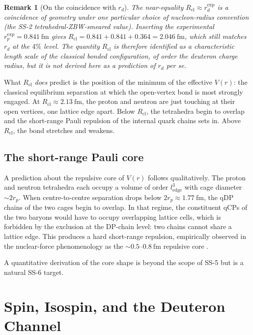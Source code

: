 \documentclass[11pt,letterpaper]{article}
\newtheorem{remark}[theorem]{Remark}
\newcommand{\ledge}{l_{\mathrm{edge}}}
\newcommand{\rp}{r_{p}}
\begin{document}
\begin{remark}[On the coincidence with $r_d$]
\label{rem:coincidence}
The near-equality $R_{\mathrm{cl}} \approx r_d^{\mathrm{exp}}$ is a coincidence of geometry under one particular choice of nucleon-radius convention (the SS-2 tetrahedral-ZBW-smeared value). Inserting the experimental $\rp^{\mathrm{exp}} = 0.841~\mathrm{fm}$ gives $R_{\mathrm{cl}} = 0.841 + 0.841 + 0.364 = 2.046~\mathrm{fm}$, which still matches $r_d$ at the $4\%$ level. The quantity $R_{\mathrm{cl}}$ is therefore identified as a characteristic length scale of the classical bonded configuration, of order the deuteron charge radius, but it is not derived here as a prediction of $r_d$ per se.
\end{remark}

What $R_{\mathrm{cl}}$ \emph{does} predict is the position of the minimum of the effective $V(r)$: the classical equilibrium separation at which the open-vertex bond is most strongly engaged. At $R_{\mathrm{cl}} \approx 2.13~\mathrm{fm}$, the proton and neutron are just touching at their open vertices, one lattice edge apart. Below $R_{\mathrm{cl}}$, the tetrahedra begin to overlap and the short-range Pauli repulsion of the internal quark chains sets in. Above $R_{\mathrm{cl}}$, the bond stretches and weakens.

\subsection{The short-range Pauli core}
\label{sec:pauli_core}

A prediction about the repulsive core of $V(r)$ follows qualitatively. The proton and neutron tetrahedra each occupy a volume of order $\ledge^3$ with cage diameter $\sim 2\rp$. When centre-to-centre separation drops below $2\rp \approx 1.77~\mathrm{fm}$, the qDP chains of the two cages begin to overlap. In that regime, the constituent qCPs of the two baryons would have to occupy overlapping lattice cells, which is forbidden by the exclusion at the DP-chain level: two chains cannot share a lattice edge. This produces a hard short-range repulsion, empirically observed in the nuclear-force phenomenology as the $\sim 0.5$--$0.8~\mathrm{fm}$ repulsive core \citep{machleidt_entem}.

A quantitative derivation of the core shape is beyond the scope of SS-5 but is a natural SS-6 target.

\section{Spin, Isospin, and the Deuteron Channel}
\label{sec:quantum_numbers}
\end{document}
